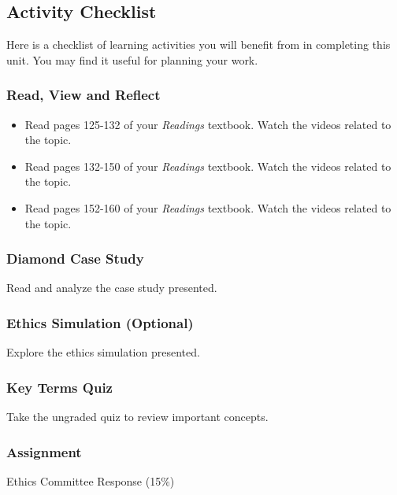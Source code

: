 \documentclass[
]{book}
\begin{document}
\hypertarget{activity-checklist-3}{%
\subsection*{Activity Checklist}\label{activity-checklist-3}}

Here is a checklist of learning activities you will benefit from in completing
this unit. You may find it useful for planning your work.

\begin{reflect}
\hypertarget{read-view-and-reflect-10}{%
\subsubsection*{Read, View and Reflect}\label{read-view-and-reflect-10}}

\begin{itemize}
\item
  Read pages 125-132 of your \emph{Readings} textbook. Watch the videos related to the topic.
\item
  Read pages 132-150 of your \emph{Readings} textbook. Watch the videos related to the topic.
\item
  Read pages 152-160 of your \emph{Readings} textbook. Watch the videos related to the topic.
\end{itemize}

\hypertarget{diamond-case-study}{%
\subsubsection*{Diamond Case Study}\label{diamond-case-study}}

Read and analyze the case study presented.

\hypertarget{ethics-simulation-optional}{%
\subsubsection*{Ethics Simulation (Optional)}\label{ethics-simulation-optional}}

Explore the ethics simulation presented.

\hypertarget{key-terms-quiz-2}{%
\subsubsection*{Key Terms Quiz}\label{key-terms-quiz-2}}

Take the ungraded quiz to review important concepts.

\hypertarget{assignment-3}{%
\subsubsection*{\texorpdfstring{\textbf{Assignment}}{Assignment}}\label{assignment-3}}

Ethics Committee Response (15\%)
\end{reflect}
\end{document}
